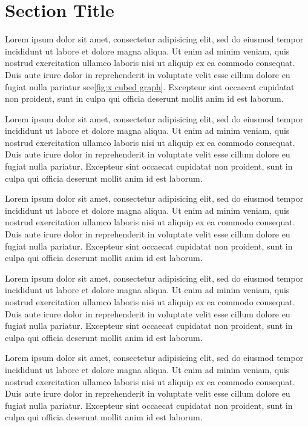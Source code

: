 \section{Section Title}
Lorem ipsum dolor sit amet, consectetur adipisicing elit, sed do eiusmod tempor incididunt ut labore et dolore magna aliqua. Ut enim ad minim veniam, quis nostrud exercitation ullamco laboris nisi ut aliquip ex ea commodo consequat. Duis aute irure dolor in reprehenderit in voluptate velit esse cillum dolore eu fugiat nulla pariatur see\ref{fig:x cubed graph}. Excepteur sint occaecat cupidatat non proident, sunt in culpa qui officia deserunt mollit anim id est laborum.

Lorem ipsum dolor sit amet, consectetur adipisicing elit, sed do eiusmod tempor incididunt ut labore et dolore magna aliqua. Ut enim ad minim veniam, quis nostrud exercitation ullamco laboris nisi ut aliquip ex ea commodo consequat. Duis aute irure dolor in reprehenderit in voluptate velit esse cillum dolore eu fugiat nulla pariatur. Excepteur sint occaecat cupidatat non proident, sunt in culpa qui officia deserunt mollit anim id est laborum.

Lorem ipsum dolor sit amet, consectetur adipisicing elit, sed do eiusmod tempor incididunt ut labore et dolore magna aliqua. Ut enim ad minim veniam, quis nostrud exercitation ullamco laboris nisi ut aliquip ex ea commodo consequat. Duis aute irure dolor in reprehenderit in voluptate velit esse cillum dolore eu fugiat nulla pariatur. Excepteur sint occaecat cupidatat non proident, sunt in culpa qui officia deserunt mollit anim id est laborum.

Lorem ipsum dolor sit amet, consectetur adipisicing elit, sed do eiusmod tempor incididunt ut labore et dolore magna aliqua. Ut enim ad minim veniam, quis nostrud exercitation ullamco laboris nisi ut aliquip ex ea commodo consequat. Duis aute irure dolor in reprehenderit in voluptate velit esse cillum dolore eu fugiat nulla pariatur. Excepteur sint occaecat cupidatat non proident, sunt in culpa qui officia deserunt mollit anim id est laborum.

Lorem ipsum dolor sit amet, consectetur adipisicing elit, sed do eiusmod tempor incididunt ut labore et dolore magna aliqua. Ut enim ad minim veniam, quis nostrud exercitation ullamco laboris nisi ut aliquip ex ea commodo consequat. Duis aute irure dolor in reprehenderit in voluptate velit esse cillum dolore eu fugiat nulla pariatur. Excepteur sint occaecat cupidatat non proident, sunt in culpa qui officia deserunt mollit anim id est laborum.

